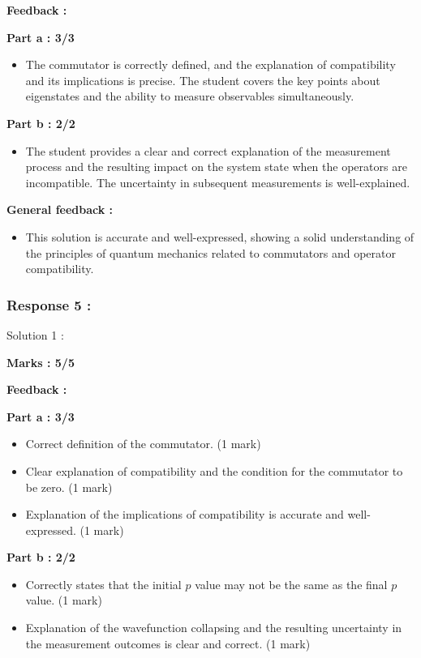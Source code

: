 \documentclass[a4paper,11pt]{article}
\begin{document}
\textbf{Feedback : }

\textbf{Part a : 3/3}

\begin{itemize}
    \item The commutator is correctly defined, and the explanation of compatibility and its implications is precise. The student covers the key points about eigenstates and the ability to measure observables simultaneously.
\end{itemize}

\textbf{Part b : 2/2}

\begin{itemize}
    \item The student provides a clear and correct explanation of the measurement process and the resulting impact on the system state when the operators are incompatible. The uncertainty in subsequent measurements is well-explained.
\end{itemize}

\textbf{General feedback :}

\begin{itemize}
    \item This solution is accurate and well-expressed, showing a solid understanding of the principles of quantum mechanics related to commutators and operator compatibility.
\end{itemize}


\subsubsection*{Response 5 :} 

Solution 1 :

\textbf{Marks : 5/5}

\textbf{Feedback : }

\textbf{Part a : 3/3}

\begin{itemize}
    \item Correct definition of the commutator. (1 mark)
    \item Clear explanation of compatibility and the condition for the commutator to be zero. (1 mark)
    \item Explanation of the implications of compatibility is accurate and well-expressed. (1 mark)
\end{itemize}

\textbf{Part b : 2/2}

\begin{itemize}
    \item Correctly states that the initial $p$ value may not be the same as the final $p$ value. (1 mark)
    \item Explanation of the wavefunction collapsing and the resulting uncertainty in the measurement outcomes is clear and correct. (1 mark)
\end{itemize}
\end{document}
